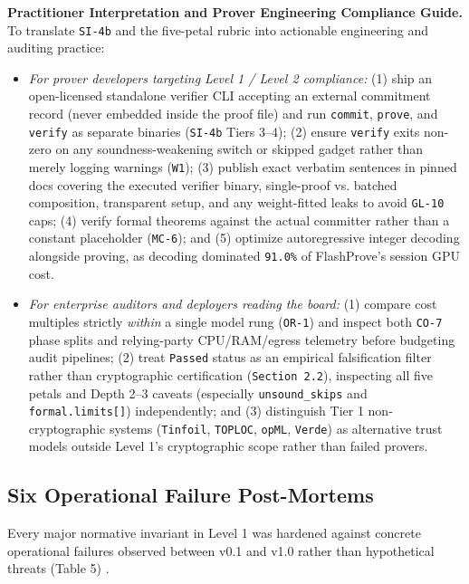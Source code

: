 \documentclass[11pt,letterpaper]{article}
\begin{document}
\textbf{Practitioner Interpretation and Prover Engineering Compliance Guide.} To translate \texttt{SI-4b} and the five-petal rubric into actionable engineering and auditing practice:

\begin{itemize}
\item \textit{For prover developers targeting Level 1 / Level 2 compliance:} (1) ship an open-licensed standalone verifier CLI accepting an external commitment record (never embedded inside the proof file) and run \texttt{commit}, \texttt{prove}, and \texttt{verify} as separate binaries (\texttt{SI-4b} Tiers 3--4); (2) ensure \texttt{verify} exits non-zero on any soundness-weakening switch or skipped gadget rather than merely logging warnings (\texttt{W1}); (3) publish exact verbatim sentences in pinned docs covering the executed verifier binary, single-proof vs. batched composition, transparent setup, and any weight-fitted leaks to avoid \texttt{GL-10} caps; (4) verify formal theorems against the actual committer rather than a constant placeholder (\texttt{MC-6}); and (5) optimize autoregressive integer decoding alongside proving, as decoding dominated \texttt{91.0\%} of FlashProve's session GPU cost.
\item \textit{For enterprise auditors and deployers reading the board:} (1) compare cost multiples strictly \textit{within} a single model rung (\texttt{OR-1}) and inspect both \texttt{CO-7} phase splits and relying-party CPU/RAM/egress telemetry before budgeting audit pipelines; (2) treat \texttt{Passed} status as an empirical falsification filter rather than cryptographic certification (\texttt{Section 2.2}), inspecting all five petals and Depth 2--3 caveats (especially \texttt{unsound\_\allowbreak{}skips} and \texttt{formal.\allowbreak{}limits[]}) independently; and (3) distinguish Tier 1 non-cryptographic systems (\texttt{Tinfoil}, \texttt{TOPLOC}, \texttt{opML}, \texttt{Verde}) as alternative trust models outside Level 1's cryptographic scope rather than failed provers.
\end{itemize}

\subsection{Six Operational Failure Post-Mortems}

Every major normative invariant in Level 1 was hardened against concrete operational failures observed between v0.1 and v1.0 rather than hypothetical threats (Table 5) \cite{iproofs2026}.
\end{document}
